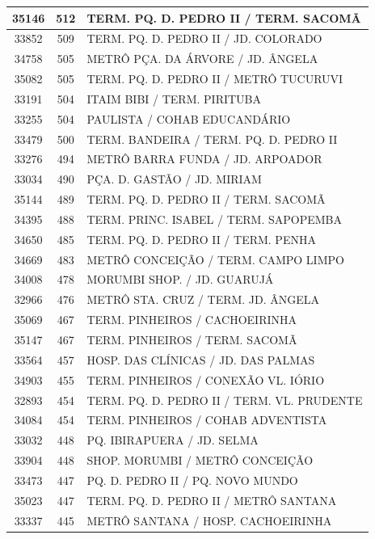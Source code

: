 \documentclass[
	12pt,				%
	oneside,			%
	a4paper,			%
	english,			%
	brazil				%
	]{abntex2ppgsi}
\begin{document}
{{{\begin{apendicesenv}
\begin{longtable}{c|c|p{7cm}}
35146 &	512 &	TERM. PQ. D. PEDRO II / TERM. SACOMÃ \\ 
 \hline 
33852 &	509 &	TERM. PQ. D. PEDRO II / JD. COLORADO \\ 
 \hline 
34758 &	505 &	METRÔ PÇA. DA ÁRVORE / JD. ÂNGELA \\ 
 \hline 
35082 &	505 &	TERM. PQ. D. PEDRO II / METRÔ TUCURUVI \\ 
 \hline 
33191 &	504 &	ITAIM BIBI / TERM. PIRITUBA \\ 
 \hline 
33255 &	504 &	PAULISTA / COHAB EDUCANDÁRIO \\ 
 \hline 
33479 &	500 &	TERM. BANDEIRA / TERM. PQ. D. PEDRO II \\ 
 \hline 
33276 &	494 &	METRÔ BARRA FUNDA / JD. ARPOADOR \\ 
 \hline 
33034 &	490 &	PÇA. D. GASTÃO / JD. MIRIAM \\ 
 \hline 
35144 &	489 &	TERM. PQ. D. PEDRO II / TERM. SACOMÃ \\ 
 \hline 
34395 &	488 &	TERM. PRINC. ISABEL / TERM. SAPOPEMBA \\ 
 \hline 
34650 &	485 &	TERM. PQ. D. PEDRO II / TERM. PENHA \\ 
 \hline 
34669 &	483 &	METRÔ CONCEIÇÃO / TERM. CAMPO LIMPO \\ 
 \hline 
34008 &	478 &	MORUMBI SHOP. / JD. GUARUJÁ \\ 
 \hline 
32966 &	476 &	METRÔ STA. CRUZ / TERM. JD. ÂNGELA \\ 
 \hline 
35069 &	467 &	TERM. PINHEIROS / CACHOEIRINHA \\ 
 \hline 
35147 &	467 &	TERM. PINHEIROS / TERM. SACOMÃ \\ 
 \hline 
33564 &	457 &	HOSP. DAS CLÍNICAS / JD. DAS PALMAS \\ 
 \hline 
34903 &	455 &	TERM. PINHEIROS / CONEXÃO VL. IÓRIO \\ 
 \hline 
32893 &	454 &	TERM. PQ. D. PEDRO II / TERM. VL. PRUDENTE \\ 
 \hline 
34084 &	454 &	TERM. PINHEIROS / COHAB ADVENTISTA \\ 
 \hline 
33032 &	448 &	PQ. IBIRAPUERA / JD. SELMA \\ 
 \hline 
33904 &	448 &	SHOP. MORUMBI / METRÔ CONCEIÇÃO \\ 
 \hline 
33473 &	447 &	PQ. D. PEDRO II / PQ. NOVO MUNDO \\ 
 \hline 
35023 &	447 &	TERM. PQ. D. PEDRO II / METRÔ SANTANA \\ 
 \hline 
33337 &	445 &	METRÔ SANTANA / HOSP. CACHOEIRINHA \\ 

\end{longtable}
\end{apendicesenv}}}}
\end{document}
